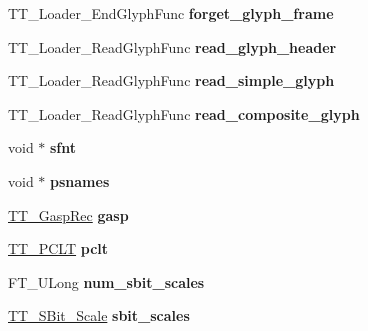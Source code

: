 \begin{DoxyCompactItemize}
\item 
\hypertarget{struct_t_t___face_rec___ac86fbd960fe6c919eb82cd7233655894}{
TT\_\-Loader\_\-EndGlyphFunc {\bfseries forget\_\-glyph\_\-frame}}
\label{struct_t_t___face_rec___ac86fbd960fe6c919eb82cd7233655894}

\item 
\hypertarget{struct_t_t___face_rec___a343db3c51a3047324fea455ac06d7cb3}{
TT\_\-Loader\_\-ReadGlyphFunc {\bfseries read\_\-glyph\_\-header}}
\label{struct_t_t___face_rec___a343db3c51a3047324fea455ac06d7cb3}

\item 
\hypertarget{struct_t_t___face_rec___aa9f550ad4e10d8232cdd3427e02e7603}{
TT\_\-Loader\_\-ReadGlyphFunc {\bfseries read\_\-simple\_\-glyph}}
\label{struct_t_t___face_rec___aa9f550ad4e10d8232cdd3427e02e7603}

\item 
\hypertarget{struct_t_t___face_rec___ac261cd70ce36c35c615fc5e2319b40c4}{
TT\_\-Loader\_\-ReadGlyphFunc {\bfseries read\_\-composite\_\-glyph}}
\label{struct_t_t___face_rec___ac261cd70ce36c35c615fc5e2319b40c4}

\item 
\hypertarget{struct_t_t___face_rec___a4c198db893da1900ee0384969d10f9f6}{
void $\ast$ {\bfseries sfnt}}
\label{struct_t_t___face_rec___a4c198db893da1900ee0384969d10f9f6}

\item 
\hypertarget{struct_t_t___face_rec___a68cd8f2554793512af611422092b4814}{
void $\ast$ {\bfseries psnames}}
\label{struct_t_t___face_rec___a68cd8f2554793512af611422092b4814}

\item 
\hypertarget{struct_t_t___face_rec___a042468253b53931f4901ac47e37fbe14}{
\hyperlink{struct_t_t___gasp__}{TT\_\-GaspRec} {\bfseries gasp}}
\label{struct_t_t___face_rec___a042468253b53931f4901ac47e37fbe14}

\item 
\hypertarget{struct_t_t___face_rec___a18faed293bc94ac00fa7612b175adc0e}{
\hyperlink{struct_t_t___p_c_l_t__}{TT\_\-PCLT} {\bfseries pclt}}
\label{struct_t_t___face_rec___a18faed293bc94ac00fa7612b175adc0e}

\item 
\hypertarget{struct_t_t___face_rec___a5437fbf3ee625e001c28ec975326922a}{
FT\_\-ULong {\bfseries num\_\-sbit\_\-scales}}
\label{struct_t_t___face_rec___a5437fbf3ee625e001c28ec975326922a}

\item 
\hypertarget{struct_t_t___face_rec___a13215cb0365ee61c889385919fbd381f}{
\hyperlink{struct_t_t___s_bit___scale_rec__}{TT\_\-SBit\_\-Scale} {\bfseries sbit\_\-scales}}
\label{struct_t_t___face_rec___a13215cb0365ee61c889385919fbd381f}


\end{DoxyCompactItemize}
